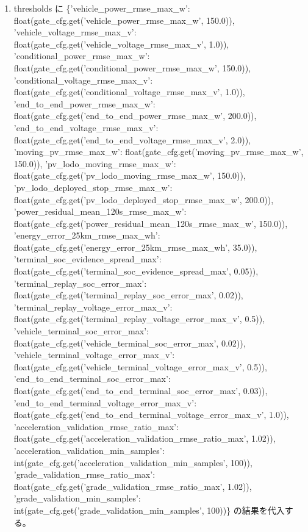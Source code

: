 \documentclass[a4paper,11pt]{article}
\begin{document}
\begin{enumerate}[leftmargin=1.8em]
\item thresholds に \{'vehicle\_power\_rmse\_max\_w': float(gate\_cfg.get('vehicle\_power\_rmse\_max\_w', 150.0)), 'vehicle\_voltage\_rmse\_max\_v': float(gate\_cfg.get('vehicle\_voltage\_rmse\_max\_v', 1.0)), 'conditional\_power\_rmse\_max\_w': float(gate\_cfg.get('conditional\_power\_rmse\_max\_w', 150.0)), 'conditional\_voltage\_rmse\_max\_v': float(gate\_cfg.get('conditional\_voltage\_rmse\_max\_v', 1.0)), 'end\_to\_end\_power\_rmse\_max\_w': float(gate\_cfg.get('end\_to\_end\_power\_rmse\_max\_w', 200.0)), 'end\_to\_end\_voltage\_rmse\_max\_v': float(gate\_cfg.get('end\_to\_end\_voltage\_rmse\_max\_v', 2.0)), 'moving\_pv\_rmse\_max\_w': float(gate\_cfg.get('moving\_pv\_rmse\_max\_w', 150.0)), 'pv\_lodo\_moving\_rmse\_max\_w': float(gate\_cfg.get('pv\_lodo\_moving\_rmse\_max\_w', 150.0)), 'pv\_lodo\_deployed\_stop\_rmse\_max\_w': float(gate\_cfg.get('pv\_lodo\_deployed\_stop\_rmse\_max\_w', 200.0)), 'power\_residual\_mean\_120s\_rmse\_max\_w': float(gate\_cfg.get('power\_residual\_mean\_120s\_rmse\_max\_w', 150.0)), 'energy\_error\_25km\_rmse\_max\_wh': float(gate\_cfg.get('energy\_error\_25km\_rmse\_max\_wh', 35.0)), 'terminal\_soc\_evidence\_spread\_max': float(gate\_cfg.get('terminal\_soc\_evidence\_spread\_max', 0.05)), 'terminal\_replay\_soc\_error\_max': float(gate\_cfg.get('terminal\_replay\_soc\_error\_max', 0.02)), 'terminal\_replay\_voltage\_error\_max\_v': float(gate\_cfg.get('terminal\_replay\_voltage\_error\_max\_v', 0.5)), 'vehicle\_terminal\_soc\_error\_max': float(gate\_cfg.get('vehicle\_terminal\_soc\_error\_max', 0.02)), 'vehicle\_terminal\_voltage\_error\_max\_v': float(gate\_cfg.get('vehicle\_terminal\_voltage\_error\_max\_v', 0.5)), 'end\_to\_end\_terminal\_soc\_error\_max': float(gate\_cfg.get('end\_to\_end\_terminal\_soc\_error\_max', 0.03)), 'end\_to\_end\_terminal\_voltage\_error\_max\_v': float(gate\_cfg.get('end\_to\_end\_terminal\_voltage\_error\_max\_v', 1.0)), 'acceleration\_validation\_rmse\_ratio\_max': float(gate\_cfg.get('acceleration\_validation\_rmse\_ratio\_max', 1.02)), 'acceleration\_validation\_min\_samples': int(gate\_cfg.get('acceleration\_validation\_min\_samples', 100)), 'grade\_validation\_rmse\_ratio\_max': float(gate\_cfg.get('grade\_validation\_rmse\_ratio\_max', 1.02)), 'grade\_validation\_min\_samples': int(gate\_cfg.get('grade\_validation\_min\_samples', 100))\} の結果を代入する。

\end{enumerate}
\end{document}
